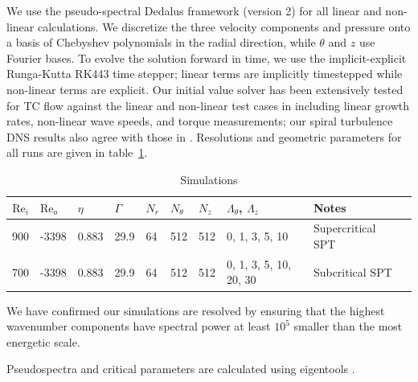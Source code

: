 \documentclass[openacc]{rstransa}%
\newcommand{\Reyn}{\mathrm{Re}}
\begin{document}
We use the pseudo-spectral Dedalus framework (version 2) \cite{2020PhRvR...2b3068B} for all linear and non-linear calculations. We discretize the three velocity components and pressure onto a basis of Chebyshev polynomials in the radial direction, while $\theta$ and $z$ use Fourier bases.
To evolve the solution forward in time, we use the implicit-explicit Runga-Kutta RK443 time stepper; linear terms are implicitly timestepped while non-linear terms are explicit.
Our initial value solver has been extensively tested for TC flow against the linear and non-linear test cases in \cite{1984JFM...146...45M, 1984JFM...146...65M} including linear growth rates, non-linear wave speeds, and torque measurements; our spiral turbulence DNS results also agree with those in \cite{2009PhRvE..80d6315M,2009PhRvE..80f7301D,2011JFM...668..150D}. 
Resolutions and geometric parameters for all runs are given in table~\ref{tab:simulations}.
\begin{table}[!h]
\caption{Simulations}
\label{tab:simulations}
\begin{tabular}{rlllllllll}
\hline
$\Reyn_i$ & $\Reyn_o$ & $\eta$ & $\Gamma$  & $N_r$ & $N_\theta$ & $N_z$& $\Lambda_\theta$, $\Lambda_z$ & Notes\\
\hline
900 & -3398 & 0.883 & 29.9 & 64 & 512 & 512 & 0, 1, 3, 5, 10 & Supercritical SPT\\
700 & -3398 & 0.883 & 29.9 & 64 & 512 & 512 & 0, 1, 3, 5, 10, 20, 30 & Subcritical SPT\\
\end{tabular}
\vspace*{-4pt}
\end{table}%
We have confirmed our simulations are resolved by ensuring that the highest wavenumber components have spectral power at least $10^5$ smaller than the most energetic scale.

Pseudospectra and critical parameters are calculated using eigentools \cite{2021JOSS....6.3079O}.
\end{document}
